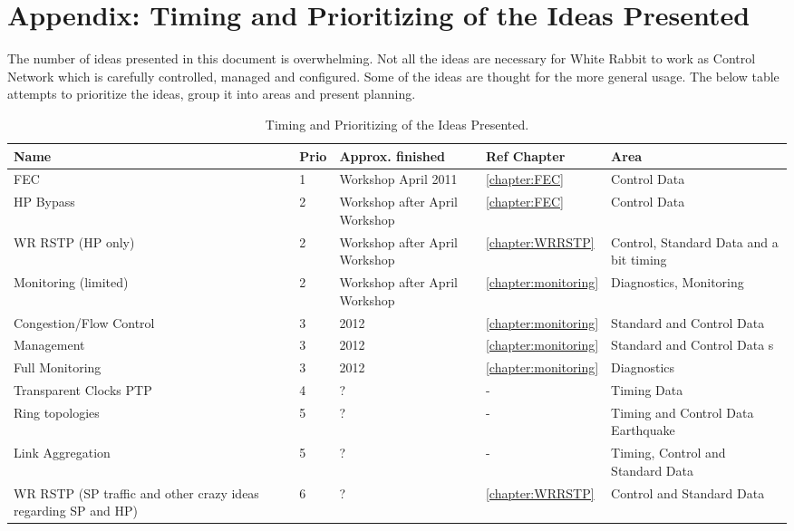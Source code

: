 \chapter{Appendix: Timing and Prioritizing of the Ideas Presented} 
\label{appF}

The number of ideas presented in this document is overwhelming. Not all the
ideas are necessary for White Rabbit to work as Control Network
which is carefully controlled, managed and configured. Some of the ideas are
thought for the more general usage. The below table attempts to prioritize the
ideas, group it into areas and present planning.


\begin{table}[ht]
\caption{Timing and Prioritizing of the Ideas Presented.} 
\centering
\begin{tabular}{| p{3.5cm} | p{1cm} | p{3.5cm} | p{1.5cm} | p{3.5cm} |} \hline
\textbf{Name}&\textbf{Prio}& \textbf{Approx. finished}&\textbf{Ref
Chapter} & \textbf{Area}  \\ \hline
FEC       & 1  & Workshop April 2011 & \ref{chapter:FEC} & Control Data\\ \hline
HP Bypass & 2  & Workshop after April Workshop & \ref{chapter:FEC} & Control
Data\\ \hline
WR RSTP (HP only)   & 2  & Workshop after April Workshop& \ref{chapter:WRRSTP} &
Control,
Standard Data and a bit timing     
\\ \hline
Monitoring (limited) & 2  & Workshop after April Workshop &
\ref{chapter:monitoring} &
Diagnostics, Monitoring   
\\ \hline \hline
Congestion/Flow Control & 3  & 2012 & \ref{chapter:monitoring} &
Standard and Control Data   
\\ \hline
Management & 3  & 2012 & \ref{chapter:monitoring} &
Standard and Control Data   s
\\ \hline
Full Monitoring & 3  & 2012 & \ref{chapter:monitoring} &
Diagnostics
\\ \hline \hline
Transparent Clocks PTP & 4  & ? & - & Timing Data
\\ \hline
Ring topologies      & 5  & ? & - & Timing and Control Data Earthquake 
\\ \hline
Link Aggregation & 5  & ? & - & Timing, Control and Standard Data
\\ \hline
WR RSTP (SP traffic and other crazy ideas regarding SP and HP)   & 6  &  ? &
\ref{chapter:WRRSTP} &
Control and Standard Data
\\ \hline


\end{tabular}
\label{tab:RobustnessPrioAndPlan}
\end{table}
